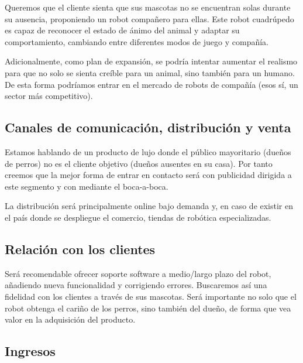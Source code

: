 Queremos que el cliente sienta que sus mascotas no se encuentran solas durante su ausencia, proponiendo un robot compañero para ellas. Este robot cuadrúpedo es capaz de reconocer el estado de ánimo del animal y adaptar su comportamiento, cambiando entre diferentes modos de juego y compañía.

Adicionalmente, como plan de expansión, se podría intentar aumentar el realismo para que no solo se sienta creíble para un animal, sino también para un humano. De esta forma podríamos entrar en el mercado de robots de compañía (esos sí, un sector más competitivo).

\subsection{Canales de comunicación, distribución y venta}


Estamos hablando de un producto de lujo donde el público mayoritario (dueños de perros) no es el cliente objetivo (dueños ausentes en su casa). Por tanto creemos que la mejor forma de entrar en contacto será con publicidad dirigida a este segmento y con mediante el boca-a-boca.

La distribución será principalmente online bajo demanda y, en caso de existir en el país donde se despliegue el comercio, tiendas de robótica especializadas.

\subsection{Relación con los clientes}


Será recomendable ofrecer soporte software a medio/largo plazo del robot, añadiendo nueva funcionalidad y corrigiendo errores. Buscaremos así una fidelidad con los clientes a través de sus mascotas.
Será importante no solo que el robot obtenga el cariño de los perros, sino también del dueño, de forma que vea valor en la adquisición del producto.

\subsection{Ingresos}

